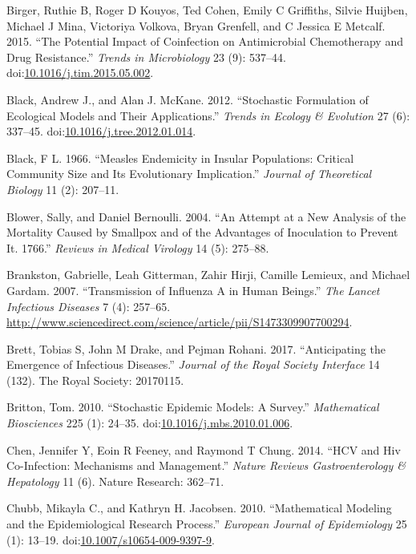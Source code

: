 \documentclass[]{book}
\theoremstyle{definition}
\theoremstyle{definition}
\theoremstyle{definition}
\theoremstyle{remark}
\begin{document}
\hypertarget{ref-birger15}{}
Birger, Ruthie B, Roger D Kouyos, Ted Cohen, Emily C Griffiths, Silvie
Huijben, Michael J Mina, Victoriya Volkova, Bryan Grenfell, and C
Jessica E Metcalf. 2015. ``The Potential Impact of Coinfection on
Antimicrobial Chemotherapy and Drug Resistance.'' \emph{Trends in
Microbiology} 23 (9): 537--44.
doi:\href{https://doi.org/10.1016/j.tim.2015.05.002}{10.1016/j.tim.2015.05.002}.

\hypertarget{ref-black12}{}
Black, Andrew J., and Alan J. McKane. 2012. ``Stochastic Formulation of
Ecological Models and Their Applications.'' \emph{Trends in Ecology \&
Evolution} 27 (6): 337--45.
doi:\href{https://doi.org/10.1016/j.tree.2012.01.014}{10.1016/j.tree.2012.01.014}.

\hypertarget{ref-black66}{}
Black, F L. 1966. ``Measles Endemicity in Insular Populations: Critical
Community Size and Its Evolutionary Implication.'' \emph{Journal of
Theoretical Biology} 11 (2): 207--11.

\hypertarget{ref-blower04}{}
Blower, Sally, and Daniel Bernoulli. 2004. ``An Attempt at a New
Analysis of the Mortality Caused by Smallpox and of the Advantages of
Inoculation to Prevent It. 1766.'' \emph{Reviews in Medical Virology} 14
(5): 275--88.

\hypertarget{ref-brankston07}{}
Brankston, Gabrielle, Leah Gitterman, Zahir Hirji, Camille Lemieux, and
Michael Gardam. 2007. ``Transmission of Influenza A in Human Beings.''
\emph{The Lancet Infectious Diseases} 7 (4): 257--65.
\url{http://www.sciencedirect.com/science/article/pii/S1473309907700294}.

\hypertarget{ref-brett17}{}
Brett, Tobias S, John M Drake, and Pejman Rohani. 2017. ``Anticipating
the Emergence of Infectious Diseases.'' \emph{Journal of the Royal
Society Interface} 14 (132). The Royal Society: 20170115.

\hypertarget{ref-britton10a}{}
Britton, Tom. 2010. ``Stochastic Epidemic Models: A Survey.''
\emph{Mathematical Biosciences} 225 (1): 24--35.
doi:\href{https://doi.org/10.1016/j.mbs.2010.01.006}{10.1016/j.mbs.2010.01.006}.

\hypertarget{ref-chen14}{}
Chen, Jennifer Y, Eoin R Feeney, and Raymond T Chung. 2014. ``HCV and
Hiv Co-Infection: Mechanisms and Management.'' \emph{Nature Reviews
Gastroenterology \& Hepatology} 11 (6). Nature Research: 362--71.

\hypertarget{ref-chubb10}{}
Chubb, Mikayla C., and Kathryn H. Jacobsen. 2010. ``Mathematical
Modeling and the Epidemiological Research Process.'' \emph{European
Journal of Epidemiology} 25 (1): 13--19.
doi:\href{https://doi.org/10.1007/s10654-009-9397-9}{10.1007/s10654-009-9397-9}.
\end{document}
